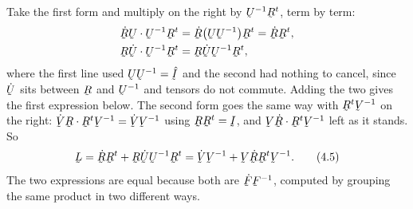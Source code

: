 Take the first form and multiply  on the right by
$\bU^{-1}\bR^{t}$, term by term:
\[
\begin{aligned}
   \dot\bR\bU\cdot\bU^{-1}\bR^{t}
     &=\dot\bR\big(\bU\bU^{-1}\big)\bR^{t}=\dot\bR\bR^{t},\\
   \bR\dot\bU\cdot\bU^{-1}\bR^{t}
     &=\bR\dot\bU\bU^{-1}\bR^{t},
\end{aligned}
\]
where the first line used $\bU\bU^{-1}=\hI$ and the second had nothing to
cancel, since $\dot\bU$ sits between $\bR$ and $\bU^{-1}$ and tensors do
not commute. Adding the two gives the first expression below. The second
form goes the same way with $\bR^{t}\bV^{-1}$ on the right:
$\dot\bV\bR\cdot\bR^{t}\bV^{-1}=\dot\bV\bV^{-1}$ using
$\bR\bR^{t}=\I$, and $\bV\dot\bR\cdot\bR^{t}\bV^{-1}$ left as it stands.
So
\begin{equation}
   \bL=\dot\bR\bR^{t}+\bR\dot\bU\bU^{-1}\bR^{t}
      =\dot\bV\bV^{-1}+\bV\dot\bR\bR^{t}\bV^{-1}.
   \tag{4.5}\label{eq:4.5}
\end{equation}
The two expressions are equal because both are $\dot\bF\bF^{-1}$, computed
by grouping the same product in two different ways.

